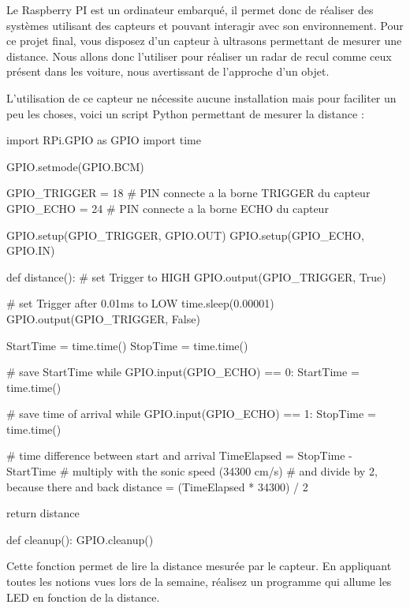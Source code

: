 Le Raspberry PI est un ordinateur embarqué, il permet donc de réaliser des systèmes utilisant des capteurs et pouvant interagir avec son environnement. Pour ce projet final, vous disposez d'un capteur à ultrasons permettant de mesurer une distance. Nous allons donc l'utiliser pour réaliser un radar de recul comme ceux présent dans les voiture, nous avertissant de l'approche d'un objet.

L'utilisation de ce capteur ne nécessite aucune installation mais pour faciliter un peu les choses, voici un script Python permettant de mesurer la distance :

\begin{python}
import RPi.GPIO as GPIO
import time

GPIO.setmode(GPIO.BCM)

GPIO_TRIGGER = 18   # PIN connecte a la borne TRIGGER du capteur
GPIO_ECHO = 24      # PIN connecte a la borne ECHO du capteur

GPIO.setup(GPIO_TRIGGER, GPIO.OUT)
GPIO.setup(GPIO_ECHO, GPIO.IN)

def distance():
    # set Trigger to HIGH
    GPIO.output(GPIO_TRIGGER, True)

    # set Trigger after 0.01ms to LOW
    time.sleep(0.00001)
    GPIO.output(GPIO_TRIGGER, False)

    StartTime = time.time()
    StopTime = time.time()

    # save StartTime
    while GPIO.input(GPIO_ECHO) == 0:
        StartTime = time.time()

    # save time of arrival
    while GPIO.input(GPIO_ECHO) == 1:
        StopTime = time.time()

    # time difference between start and arrival
    TimeElapsed = StopTime - StartTime
    # multiply with the sonic speed (34300 cm/s)
    # and divide by 2, because there and back
    distance = (TimeElapsed * 34300) / 2

    return distance

def cleanup():
    GPIO.cleanup()

\end{python}

Cette fonction permet de lire la distance mesurée par le capteur. En appliquant toutes les notions vues lors de la semaine, réalisez un programme qui allume les LED en fonction de la distance.